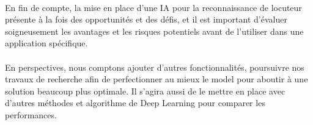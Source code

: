 \paragraph{}En fin de compte, la mise en place d'une IA pour la reconnaissance de locuteur présente à la fois des opportunités et des défis, et il est important d'évaluer soigneusement les avantages et les risques potentiels avant de l'utiliser dans une application spécifique.
\paragraph{}En perspectives, nous comptons ajouter d’autres fonctionnalités, poursuivre nos travaux de recherche afin de perfectionner au mieux le model pour aboutir à une solution beaucoup plus optimale. Il s’agira aussi de le mettre en place avec d’autres méthodes et algorithme de Deep Learning pour comparer les performances. 

